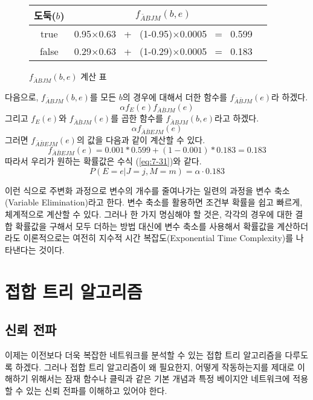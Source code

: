 \documentclass[a4paper]{oblivoir}
\begin{document}
\begin{figure}[ht] \centering
\begin{tabular}{|c|c|c|}
  \hline
  도둑($b$)  &  $f_{\bar{A}BJM}(b,e)$\\
  \hline
  true & 0.95$\times$0.63 \ + \ (1-0.95)$\times$0.0005 \ = \ 0.599\\ 
  \hline
  false & 0.29$\times$0.63 \ + \ (1-0.29)$\times$0.0005 \ = \ 0.183\\ 
  \hline
\end{tabular}
\caption{$f_{\bar{A}BJM}(b,e)$ 계산 표}
\label{fig:7-23}
\end{figure} 

\noindent 다음으로, $f_{\bar{A}BJM}(b,e)$를 모든 $b$의 경우에 대해서 더한 함수를 $f_{\bar{A}\bar{B}JM}(e)$라 하겠다.
\begin{equation}
\alpha f_{E}(e) f_{\bar{A}\bar{B}JM}(e)
\label{eq:7-28}
\end{equation}
그리고 $f_{E}(e)$와 $f_{\bar{A}\bar{B}JM}(e)$를 곱한 함수를 $f_{\bar{A}BJM}(b,e)$라고 하겠다.
\begin{equation}
\alpha f_{\bar{A}\bar{B}EJM}(e)
\label{eq:7-29}
\end{equation}
그러면 $f_{\bar{A}\bar{B}EJM}(e)$의 값을 다음과 같이 계산할 수 있다.  
\begin{equation}
f_{\bar{A}\bar{B}EJM}(e) = 0.001*0.599+(1-0.001)*0.183 = 0.183
\label{eq:7-30}
\end{equation}
따라서 우리가 원하는 확률값은 수식 (\ref{eq:7-31})와 같다.
\begin{equation}
P(E=e | J=j, M=m) = \alpha \cdot 0.183
\label{eq:7-31}
\end{equation}

이런 식으로 주변화 과정으로 변수의 개수를 줄여나가는 일련의 과정을 변수 축소(Variable Elimination)라고 한다. 변수 축소를 활용하면 조건부 확률을 쉽고 빠르게, 체계적으로 계산할 수 있다. 그러나 한 가지 명심해야 할 것은, 각각의 경우에 대한 결합 확률값을 구해서 모두 더하는 방법 대신에 변수 축소를 사용해서 확률값을 계산하더라도 이론적으로는 여전히 지수적 시간 복잡도(Exponential Time Complexity)를 나타낸다는 것이다. 

\section{접합 트리 알고리즘}
\subsection{신뢰 전파}
이제는 이전보다 더욱 복잡한 네트워크를 분석할 수 있는 접합 트리 알고리즘을 다루도록 하겠다. 그러나 접합 트리 알고리즘이 왜 필요한지,  어떻게 작동하는지를 제대로 이해하기 위해서는 잠재 함수나 클릭과 같은 기본 개념과 특정 베이지안 네트워크에 적용할 수 있는 신뢰 전파를 이해하고 있어야 한다. \\
\end{document}
